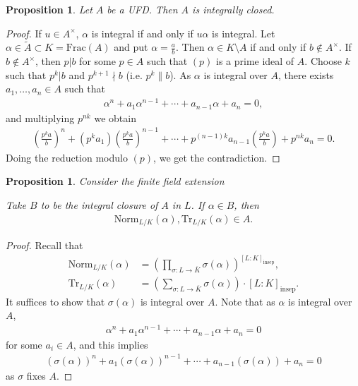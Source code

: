 \documentclass[12pt]{report}
\theoremstyle{plain}
\newtheorem{proposition}[theorem]{Proposition}
\theoremstyle{remark}
\theoremstyle{definition}
\begin{document}
\begin{proposition}
    Let $A$ be a UFD. Then $A$ is integrally closed.
\end{proposition}
\begin{proof}
    If $u\in A^\times$, $\alpha$ is integral if and only if $u\alpha$ is integral. Let $\alpha\in \tilde{A}\subset K=\mathrm{Frac}(A)$ and put $\alpha=\frac{a}{b}$. Then $\alpha\in K\setminus A$ if and only if $b\notin A^\times$. If $b\notin A^\times$, then $p|b$ for some $p\in A$ such that $(p)$ is a prime ideal of $A$. Choose $k$ such that $p^k|b$ and $p^{k+1}\nmid b$ (i.e. $p^k \| b$). As $\alpha$ is integral over $A$, there exists $a_1,\dots,a_n\in A$ such that
    \begin{align*}
        \alpha^n+a_1\alpha^{n-1}+\cdots+a_{n-1}\alpha+a_n = 0,
    \end{align*}
    and multiplying $p^{nk}$ we obtain
    \begin{align*}
        \left( \frac{p^ka}{b}\right)^n + (p^ka_1) \left(\frac{p^ka}{b}\right)^{n-1} + \cdots+ p^{(n-1)k}a_{n-1}\left(\frac{p^ka}{b}\right) + p^{nk}a_n=0.
    \end{align*}
    Doing the reduction modulo $(p)$, we get the contradiction.
\end{proof}

\begin{proposition}
    Consider the finite field extension
    \begin{figure}[H]
        \centering
    \end{figure}
    \noindent Take $B$ to be the integral closure of $A$ in $L$. If $\alpha\in B$, then
    \begin{align*}
        \mathrm{Norm}_{L/K}(\alpha),\mathrm{Tr}_{L/K}(\alpha)\in A.
    \end{align*}
\end{proposition}
\begin{proof}
    Recall that
    \begin{align*}
        \mathrm{Norm}_{L/K}(\alpha) &= \left(\prod_{\sigma:L\to\overline{K}}\sigma(\alpha)\right)^{[L:K]_{\mathrm{insep}}}, \\
        \mathrm{Tr}_{L/K}(\alpha) &= \left(\sum_{\sigma:L\to\overline{K}}\sigma(\alpha)\right)\cdot[L:K]_{\mathrm{insep}}.
    \end{align*}
    It suffices to show that $\sigma(\alpha)$ is integral over $A$. Note that as $\alpha$ is integral over $A$,
    \begin{align*}
        \alpha^n+a_1\alpha^{n-1}+\cdots+a_{n-1}\alpha+a_n=0
    \end{align*}
    for some $a_i\in A$, and this implies
    \begin{align*}
        (\sigma(\alpha))^n + a_1(\sigma(\alpha))^{n-1}+\cdots+a_{n-1}(\sigma(\alpha))+a_n=0
    \end{align*}
    as $\sigma$ fixes $A$.
\end{proof}
\end{document}

